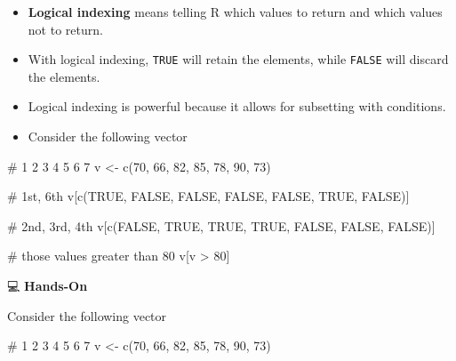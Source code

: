 \documentclass[
  letterpaper,
  DIV=11,
  numbers=noendperiod]{scrreprt}
\newenvironment{Shaded}{\begin{snugshade}}{\end{snugshade}}
\newcommand{\CommentTok}[1]{\textcolor[rgb]{0.37,0.37,0.37}{#1}}
\newcommand{\ConstantTok}[1]{\textcolor[rgb]{0.56,0.35,0.01}{#1}}
\newcommand{\DecValTok}[1]{\textcolor[rgb]{0.68,0.00,0.00}{#1}}
\newcommand{\FunctionTok}[1]{\textcolor[rgb]{0.28,0.35,0.67}{#1}}
\newcommand{\NormalTok}[1]{\textcolor[rgb]{0.00,0.23,0.31}{#1}}
\newcommand{\OtherTok}[1]{\textcolor[rgb]{0.00,0.23,0.31}{#1}}
\newcommand{\SpecialCharTok}[1]{\textcolor[rgb]{0.37,0.37,0.37}{#1}}
\begin{document}
\begin{itemize}
\item
  \textbf{Logical indexing} means telling R which values to return and
  which values not to return.
\item
  With logical indexing, \texttt{TRUE} will retain the elements, while
  \texttt{FALSE} will discard the elements.
\item
  Logical indexing is powerful because it allows for subsetting with
  conditions.
\item
  Consider the following vector
\end{itemize}

\begin{Shaded}
\begin{Highlighting}[]
\CommentTok{\#       1   2   3   4   5   6   7}
\NormalTok{v }\OtherTok{\textless{}{-}} \FunctionTok{c}\NormalTok{(}\DecValTok{70}\NormalTok{, }\DecValTok{66}\NormalTok{, }\DecValTok{82}\NormalTok{, }\DecValTok{85}\NormalTok{, }\DecValTok{78}\NormalTok{, }\DecValTok{90}\NormalTok{, }\DecValTok{73}\NormalTok{)}

\CommentTok{\# 1st, 6th}
\NormalTok{v[}\FunctionTok{c}\NormalTok{(}\ConstantTok{TRUE}\NormalTok{, }\ConstantTok{FALSE}\NormalTok{, }\ConstantTok{FALSE}\NormalTok{, }\ConstantTok{FALSE}\NormalTok{, }\ConstantTok{FALSE}\NormalTok{, }\ConstantTok{TRUE}\NormalTok{, }\ConstantTok{FALSE}\NormalTok{)]    }

\CommentTok{\# 2nd, 3rd, 4th}
\NormalTok{v[}\FunctionTok{c}\NormalTok{(}\ConstantTok{FALSE}\NormalTok{, }\ConstantTok{TRUE}\NormalTok{, }\ConstantTok{TRUE}\NormalTok{, }\ConstantTok{TRUE}\NormalTok{, }\ConstantTok{FALSE}\NormalTok{, }\ConstantTok{FALSE}\NormalTok{, }\ConstantTok{FALSE}\NormalTok{)]     }

\CommentTok{\# those values greater than 80}
\NormalTok{v[v }\SpecialCharTok{\textgreater{}} \DecValTok{80}\NormalTok{]    }
\end{Highlighting}
\end{Shaded}

💻 \textbf{Hands-On}

Consider the following vector

\begin{Shaded}
\begin{Highlighting}[]
\CommentTok{\#       1   2   3   4   5   6   7}
\NormalTok{v }\OtherTok{\textless{}{-}} \FunctionTok{c}\NormalTok{(}\DecValTok{70}\NormalTok{, }\DecValTok{66}\NormalTok{, }\DecValTok{82}\NormalTok{, }\DecValTok{85}\NormalTok{, }\DecValTok{78}\NormalTok{, }\DecValTok{90}\NormalTok{, }\DecValTok{73}\NormalTok{)}
\end{Highlighting}
\end{Shaded}
\end{document}
